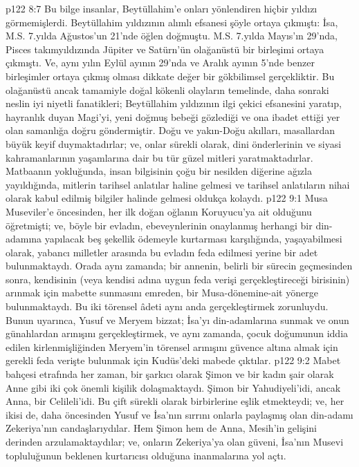 \vs p122 8:7 Bu bilge insanlar, Beytüllahim’e onları yönlendiren hiçbir yıldızı görmemişlerdi. Beytüllahim yıldızının alımlı efsanesi şöyle ortaya çıkmıştı: İsa, M.S. 7.yılda Ağustos’un 21’nde öğlen doğmuştu. M.S. 7.yılda Mayıs’ın 29’nda, Pisces takımyıldızında Jüpiter ve Satürn’ün olağanüstü bir birleşimi ortaya çıkmıştı. Ve, aynı yılın Eylül ayının 29’nda ve Aralık ayının 5’nde benzer birleşimler ortaya çıkmış olması dikkate değer bir gökbilimsel gerçekliktir. Bu olağanüstü ancak tamamiyle doğal kökenli olayların temelinde, daha sonraki neslin iyi niyetli fanatikleri; Beytüllahim yıldızının ilgi çekici efsanesini yaratıp, hayranlık duyan Magi’yi, yeni doğmuş bebeği gözlediği ve ona ibadet ettiği yer olan samanlığa doğru göndermiştir. Doğu ve yakın\hyp{}Doğu akılları, masallardan büyük keyif duymaktadırlar; ve, onlar sürekli olarak, dini önderlerinin ve siyasi kahramanlarının yaşamlarına dair bu tür güzel mitleri yaratmaktadırlar. Matbaanın yokluğunda, insan bilgisinin çoğu bir nesilden diğerine ağızla yayıldığında, mitlerin tarihsel anlatılar haline gelmesi ve tarihsel anlatıların nihai olarak kabul edilmiş bilgiler halinde gelmesi oldukça kolaydı.
\vs p122 9:1 Musa Museviler’e öncesinden, her ilk doğan oğlanın Koruyucu’ya ait olduğunu öğretmişti; ve, böyle bir evladın, ebeveynlerinin onaylanmış herhangi bir din\hyp{}adamına yapılacak beş şekellik ödemeyle kurtarması karşılığında, yaşayabilmesi olarak, yabancı milletler arasında bu evladın feda edilmesi yerine bir adet bulunmaktaydı. Orada aynı zamanda; bir annenin, belirli bir sürecin geçmesinden sonra, kendisinin (veya kendisi adına uygun feda verişi gerçekleştireceği birisinin) arınmak için mabette sunmasını emreden, bir Musa\hyp{}dönemine\hyp{}ait yönerge bulunmaktaydı. Bu iki törensel âdeti aynı anda gerçekleştirmek zorunluydu. Bunun uyarınca, Yusuf ve Meryem bizzat; İsa’yı din\hyp{}adamlarına sunmak ve onun günahlardan arınışını gerçekleştirmek, ve aynı zamanda, çocuk doğumunun iddia edilen kirlenmişliğinden Meryem’in törensel arınışını güvence altına almak için gerekli feda verişte bulunmak için Kudüs’deki mabede çıktılar.
\vs p122 9:2 Mabet bahçesi etrafında her zaman, bir şarkıcı olarak Şimon ve bir kadın şair olarak Anne gibi iki çok önemli kişilik dolaşmaktaydı. Şimon bir Yahudiyeli’idi, ancak Anna, bir Celileli’idi. Bu çift sürekli olarak birbirlerine eşlik etmekteydi; ve, her ikisi de, daha öncesinden Yusuf ve İsa’nın sırrını onlarla paylaşmış olan din\hyp{}adamı Zekeriya’nın candaşlarıydılar. Hem Şimon hem de Anna, Mesih’in gelişini derinden arzulamaktaydılar; ve, onların Zekeriya’ya olan güveni, İsa’nın Musevi topluluğunun beklenen kurtarıcısı olduğuna inanmalarına yol açtı.
